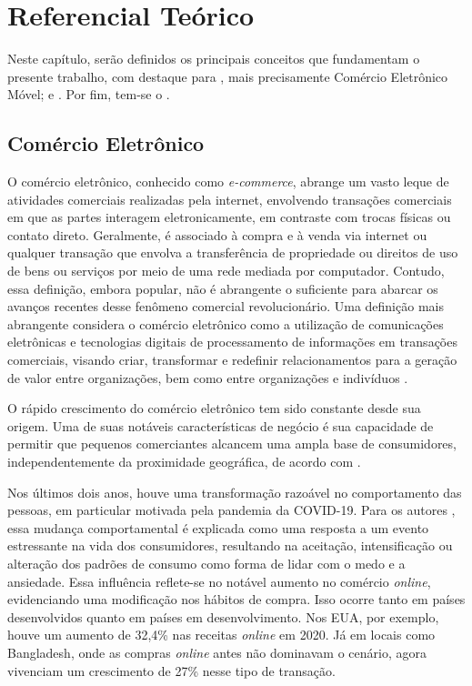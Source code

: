 \chapter{Referencial Teórico}
\label{chap:refteo}

Neste capítulo, serão definidos os principais conceitos que fundamentam o presente trabalho, com destaque para , mais precisamente Comércio Eletrônico Móvel;  e . Por fim, tem-se o .

\section{Comércio Eletrônico} \label{comele}

O comércio eletrônico, conhecido como \textit{e-commerce}, abrange um vasto leque de atividades comerciais realizadas pela internet, envolvendo transações comerciais em que as partes interagem eletronicamente, em contraste com trocas físicas ou contato direto. Geralmente, é associado à compra e à venda via internet ou qualquer transação que envolva a transferência de propriedade ou direitos de uso de bens ou serviços por meio de uma rede mediada por computador. Contudo, essa definição, embora popular, não é abrangente o suficiente para abarcar os avanços recentes desse fenômeno comercial revolucionário. Uma definição mais abrangente considera o comércio eletrônico como a utilização de comunicações eletrônicas e tecnologias digitais de processamento de informações em transações comerciais, visando criar, transformar e redefinir relacionamentos para a geração de valor entre organizações, bem como entre organizações e indivíduos .

O rápido crescimento do comércio eletrônico tem sido constante desde sua origem. Uma de suas notáveis características de negócio é sua capacidade de permitir que pequenos comerciantes alcancem uma ampla base de consumidores, independentemente da proximidade geográfica, de acordo com .

Nos últimos dois anos, houve uma transformação razoável no comportamento das pessoas, em particular motivada pela pandemia da COVID-19. Para os autores , essa mudança comportamental é explicada como uma resposta a um evento estressante na vida dos consumidores, resultando na aceitação, intensificação ou alteração dos padrões de consumo como forma de lidar com o medo e a ansiedade. Essa influência reflete-se no notável aumento no comércio \textit{online}, evidenciando uma modificação nos hábitos de compra. Isso ocorre tanto em países desenvolvidos quanto em países em desenvolvimento. Nos EUA, por exemplo, houve um aumento de 32,4\% nas receitas \textit{online} em 2020. Já em locais como Bangladesh, onde as compras \textit{online} antes não dominavam o cenário, agora vivenciam um crescimento de 27\% nesse tipo de transação.

